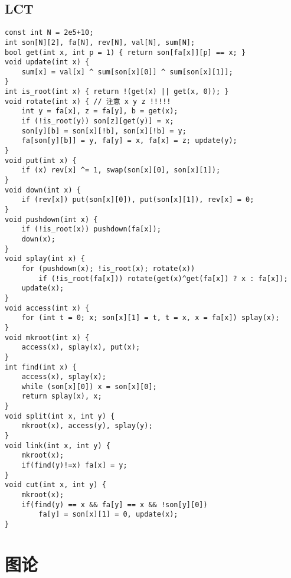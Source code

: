 \documentclass[a4paper,landscape,twocolumn]{ctexart}
\begin{document}
%

\subsection{LCT}

\begin{lstlisting}
const int N = 2e5+10;
int son[N][2], fa[N], rev[N], val[N], sum[N];
bool get(int x, int p = 1) { return son[fa[x]][p] == x; }
void update(int x) {
	sum[x] = val[x] ^ sum[son[x][0]] ^ sum[son[x][1]];
}
int is_root(int x) { return !(get(x) || get(x, 0)); }
void rotate(int x) { // 注意 x y z !!!!!
	int y = fa[x], z = fa[y], b = get(x);
	if (!is_root(y)) son[z][get(y)] = x;
	son[y][b] = son[x][!b], son[x][!b] = y;
	fa[son[y][b]] = y, fa[y] = x, fa[x] = z; update(y);
}
void put(int x) {
	if (x) rev[x] ^= 1, swap(son[x][0], son[x][1]);
}
void down(int x) {
	if (rev[x]) put(son[x][0]), put(son[x][1]), rev[x] = 0;
}
void pushdown(int x) {
	if (!is_root(x)) pushdown(fa[x]);
	down(x);
}
void splay(int x) {
	for (pushdown(x); !is_root(x); rotate(x))
		if (!is_root(fa[x])) rotate(get(x)^get(fa[x]) ? x : fa[x]);
	update(x);
}
void access(int x) {
	for (int t = 0; x; son[x][1] = t, t = x, x = fa[x]) splay(x);
}
void mkroot(int x) {
	access(x), splay(x), put(x);
}
int find(int x) {
	access(x), splay(x);
	while (son[x][0]) x = son[x][0];
	return splay(x), x;
}
void split(int x, int y) {
	mkroot(x), access(y), splay(y);
}
void link(int x, int y) {
	mkroot(x);
	if(find(y)!=x) fa[x] = y;
}
void cut(int x, int y) {
	mkroot(x);
	if(find(y) == x && fa[y] == x && !son[y][0])
		fa[y] = son[x][1] = 0, update(x);
}
\end{lstlisting}

\section{图论}
\end{document}
